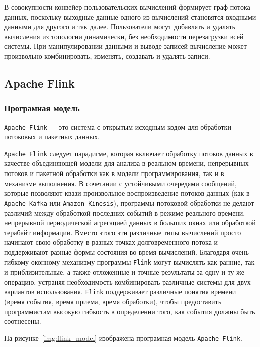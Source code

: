 В совокупности конвейер пользовательских вычислений формирует граф потока данных, поскольку выходные данные одного из вычислений становятся входными данными для другого и так далее.
Пользователи могут добавлять и удалять вычисления из топологии динамически, без необходимости перезагрузки всей системы. 
При манипулировании данными и выводе записей вычисление может произвольно комбинировать, изменять, создавать и удалять записи.

\subsection{Apache Flink}

\subsubsection{Програмная модель}

\texttt{Apache Flink} --- это система с открытым исходным кодом для обработки потоковых и пакетных данных.


\texttt{Apache Flink} следует парадигме, которая включает обработку потоков данных в качестве объединяющей модели для анализа в реальном времени, непрерывных потоков и пакетной обработки как в модели программирования, так и в механизме выполнения.
В сочетании с устойчивыми очередями сообщений, которые позволяют квази-произвольное воспроизведение потоков данных (как в \texttt{Apache Kafka} или \texttt{Amazon Kinesis}), программы потоковой обработки не делают различий между обработкой последних событий в режиме реального времени, непрерывной периодической агрегацией данных в больших окнах или обработкой терабайт информации.
Вместо этого эти различные типы вычислений просто начинают свою обработку в разных точках долговременного потока и поддерживают разные формы состояния во время вычислений. 
Благодаря очень гибкому оконному механизму программы \texttt{Flink} могут вычислять как ранние, так и приблизительные, а также отложенные и точные результаты за одну и ту же операцию, устраняя необходимость комбинировать различные системы для двух вариантов использования. 
\texttt{Flink} поддерживает различные понятия времени (время события, время приема, время обработки), чтобы предоставить программистам высокую гибкость в определении того, как события должны быть соотнесены.

На рисунке~\ref{img:flink_model} изображена програмная модель \texttt{Apache Flink}.


